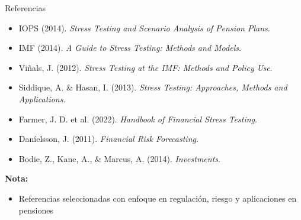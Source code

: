 \documentclass{beamer}
\begin{document}
\begin{frame}{Referencias}

\footnotesize

\begin{itemize}

\item IOPS (2014). \textit{Stress Testing and Scenario Analysis of Pension Plans}. \\

\item IMF (2014). \textit{A Guide to Stress Testing: Methods and Models}. \\

\item Viñals, J. (2012). \textit{Stress Testing at the IMF: Methods and Policy Use}. \\

\item Siddique, A. \& Hasan, I. (2013). \textit{Stress Testing: Approaches, Methods and Applications}. \\

\item Farmer, J. D. et al. (2022). \textit{Handbook of Financial Stress Testing}. \\

\item Daníelsson, J. (2011). \textit{Financial Risk Forecasting}. \\

\item Bodie, Z., Kane, A., \& Marcus, A. (2014). \textit{Investments}. \\

\end{itemize}

\vspace{0.4cm}

\textbf{Nota:}
\begin{itemize}
\item Referencias seleccionadas con enfoque en regulación, riesgo y aplicaciones en pensiones
\end{itemize}

\end{frame}
\end{document}

